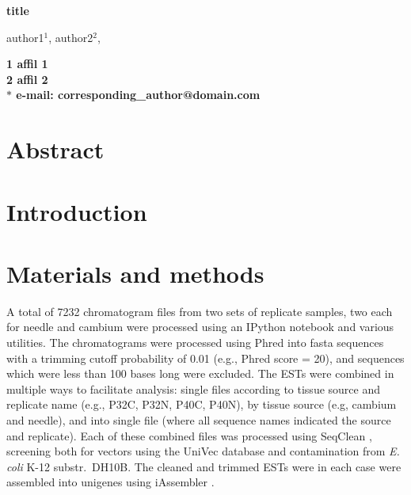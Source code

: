 \documentclass[11pt]{article}
\begin{document}
\begin{flushleft} 
\singlespacing
{\large \textbf{title}}

author1$^{1}$, 
author2$^{2}$,


\bf{1} affil 1
\\
\bf{2} affil 2
\\

$\ast$ e-mail: corresponding\_author@domain.com
\end{flushleft}

\section*{Abstract}

\section*{Introduction}

\section*{Materials and methods}\label{ss:mats}
A total of 7232 chromatogram files from two sets of replicate
samples, two each for needle and cambium were processed using an
IPython \citep[v 2.1]{per-gra:2007} notebook and various utilities.
The chromatograms were processed using Phred \citep[v.\
020425]{ewing1998b} into fasta sequences with a trimming cutoff
probability of 0.01 (e.g., Phred score = 20), and sequences which were
less than 100 bases long were excluded.  The ESTs were combined in
multiple ways to facilitate analysis: single files according to tissue
source and replicate name (e.g., P32C, P32N, P40C, P40N), by tissue
source (e.g, cambium and needle), and into single file (where all
sequence names indicated the source and replicate).  Each of these
combined files was processed using SeqClean \citep[v.\ 2/2011][default
parameters]{citeulike:1911083}, screening both for vectors using the
UniVec \citep{cochrane01012010} database and contamination from
\textit{E. coli} K-12 substr.\ DH10B.  The cleaned and trimmed ESTs
were in each case were assembled into unigenes using iAssembler
\citep[v.\ 1.3.2][default parameters]{zheng2011iassembler}.
\end{document}
